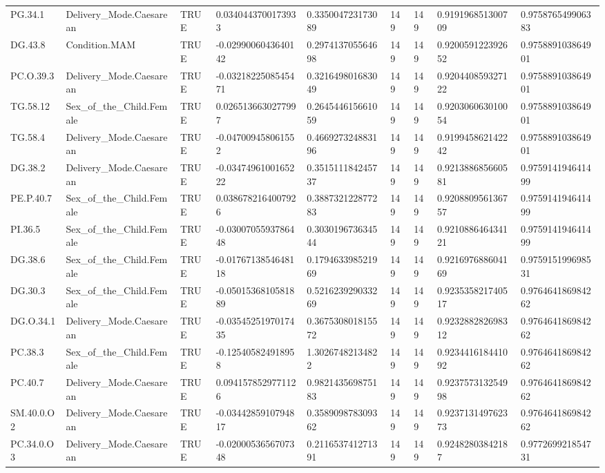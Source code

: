 \begin{longtable}{lllllllll}
PG.34.1 & Delivery\_Mode.Caesarean & TRUE & 0.0340443700173933 & 0.335004723173089 & 149 & 149 & 0.919196851300709 & 0.975876549906383 \\
DG.43.8 & Condition.MAM & TRUE & -0.0299006043640142 & 0.297413705564698 & 149 & 149 & 0.920059122392652 & 0.975889103864901 \\
PC.O.39.3 & Delivery\_Mode.Caesarean & TRUE & -0.0321822508545471 & 0.321649801683049 & 149 & 149 & 0.920440859327122 & 0.975889103864901 \\
TG.58.12 & Sex\_of\_the\_Child.Female & TRUE & 0.0265136630277997 & 0.264544615661059 & 149 & 149 & 0.920306063010054 & 0.975889103864901 \\
TG.58.4 & Delivery\_Mode.Caesarean & TRUE & -0.047009458061552 & 0.466927324883196 & 149 & 149 & 0.919945862142242 & 0.975889103864901 \\
DG.38.2 & Delivery\_Mode.Caesarean & TRUE & -0.0347496100165222 & 0.351511184245737 & 149 & 149 & 0.921388685660581 & 0.975914194641499 \\
PE.P.40.7 & Sex\_of\_the\_Child.Female & TRUE & 0.0386782164007926 & 0.388732122877283 & 149 & 149 & 0.920880956136757 & 0.975914194641499 \\
PI.36.5 & Sex\_of\_the\_Child.Female & TRUE & -0.0300705593786448 & 0.303019673634544 & 149 & 149 & 0.921088646434121 & 0.975914194641499 \\
DG.38.6 & Sex\_of\_the\_Child.Female & TRUE & -0.0176713854648118 & 0.179463398521969 & 149 & 149 & 0.921697688604169 & 0.975915199698531 \\
DG.30.3 & Sex\_of\_the\_Child.Female & TRUE & -0.0501536810581889 & 0.521623929033269 & 149 & 149 & 0.923535821740517 & 0.976464186984262 \\
DG.O.34.1 & Delivery\_Mode.Caesarean & TRUE & -0.0354525197017435 & 0.367530801815572 & 149 & 149 & 0.923288282698312 & 0.976464186984262 \\
PC.38.3 & Sex\_of\_the\_Child.Female & TRUE & -0.125405824918958 & 1.30267482134822 & 149 & 149 & 0.923441618441092 & 0.976464186984262 \\
PC.40.7 & Delivery\_Mode.Caesarean & TRUE & 0.0941578529771126 & 0.982143569875183 & 149 & 149 & 0.923757313254998 & 0.976464186984262 \\
SM.40.0.O2 & Delivery\_Mode.Caesarean & TRUE & -0.0344285910794817 & 0.358909878309362 & 149 & 149 & 0.923713149762373 & 0.976464186984262 \\
PC.34.0.O3 & Delivery\_Mode.Caesarean & TRUE & -0.0200053656707348 & 0.211653741271391 & 149 & 149 & 0.92482803842187 & 0.977269921854731 \\

\end{longtable}
